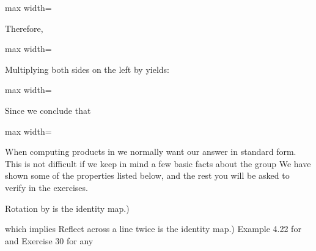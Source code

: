 \documentclass[11pt,oneside]{article}
\begin{document}
\begin{BookBody}

\begin{center}\begin{adjustbox}{max width=\linewidth}\end{adjustbox}\end{center}

Therefore,

\begin{center}\begin{adjustbox}{max width=\linewidth}\end{adjustbox}\end{center}

\noindent Multiplying both sides on the left by \BookInline{\mu } yields:

\begin{center}\begin{adjustbox}{max width=\linewidth}\end{adjustbox}\end{center}

\noindent Since \BookInline{\mu \mu = \iota,\allowbreak } we conclude that

\begin{center}\begin{adjustbox}{max width=\linewidth}\end{adjustbox}\end{center} \BookEnd{\blacktriangle}

\noindent When computing products in  we normally want our answer in standard form. This is not difficult if we keep in mind a few basic facts about the group  We have shown some of the properties listed below, and the rest you will be asked to verify in the exercises.

\noindent {}Rotation by \BookInline{2\pi } is the identity map.)

\noindent {}

\noindent {} which implies Reflect across a line twice is the identity map.) Example 4.22 for  and Exercise 30 for any 


\end{BookBody}
\end{document}
